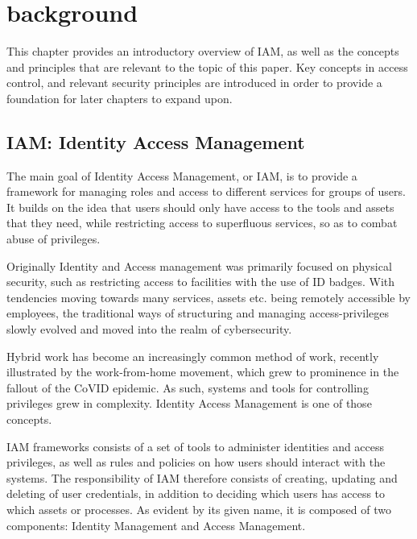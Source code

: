 \section{background}
This chapter provides an introductory overview of IAM, as well as the concepts and principles that are relevant to the topic of this paper. Key concepts in access control, and relevant security principles are introduced in order to provide a foundation for later chapters to expand upon.


\subsection{IAM: Identity Access Management}
The main goal of Identity Access Management, or IAM, is to provide a framework for managing roles and access to different services for groups of users\citep{Gartner-DefIAM}. It builds on the idea that users should only have access to the tools and assets that they need, while restricting access to superfluous services, so as to combat abuse of privileges.

Originally Identity and Access management was primarily focused on physical security, such as restricting access to facilities with the use of ID badges. With tendencies moving towards many services, assets etc. being remotely accessible by employees, the traditional ways of structuring and managing access-privileges slowly evolved and moved into the realm of cybersecurity\citep{StrongDM-IAM}.

Hybrid work has become an increasingly common method of work, recently illustrated by the work-from-home movement, which grew to prominence in the fallout of the CoVID epidemic. As such, systems and tools for controlling privileges grew in complexity. Identity Access Management is one of those concepts.

IAM frameworks consists of a set of tools to administer identities and access privileges, as well as rules and policies on how users should interact with the systems. The responsibility of IAM therefore consists of creating, updating and deleting of user credentials, in addition to deciding which users has access to which assets or processes\citep{IAM-ComprehensiveStudy}. As evident by its given name, it is composed of two components: Identity Management and Access Management.

